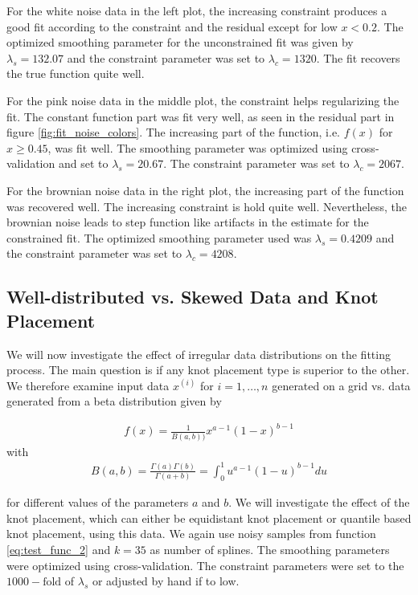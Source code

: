 \documentclass[10pt,a4paper]{article}
\begin{document}
For the white noise data in the left plot, the increasing constraint produces a good fit according to the constraint and the residual except for low $x < 0.2$. The optimized smoothing parameter for the unconstrained fit was given by $\lambda_s = 132.07$ and the constraint parameter was set to $\lambda_c = 1320$. The fit recovers the true function quite well. 

For the pink noise data in the middle plot, the constraint helps regularizing the fit. The constant function part was fit very well, as seen in the residual part in figure \ref{fig:fit_noise_colors}. The increasing part of the function, i.e. $f(x)$ for $x \ge 0.45$,  was fit well. The smoothing parameter was optimized using cross-validation and set to $\lambda_s = 20.67$. The constraint parameter was set to $\lambda_c = 2067$. 

For the brownian noise data in the right plot, the increasing part of the function was recovered well. The increasing constraint is hold quite well. Nevertheless, the brownian noise leads to step function like artifacts in the estimate for the constrained fit. The optimized smoothing parameter used was $\lambda_s = 0.4209$ and the constraint parameter was set to $\lambda_c = 4208$.

\subsection{Well-distributed vs. Skewed Data and Knot Placement} \label{subsec:skewed-data}
We will now investigate the effect of irregular data distributions on the fitting process. The main question is if any knot placement type is superior to the other. We therefore examine input data $x^{(i)}$ for $i = 1, \dots, n$ generated on a grid vs. data generated from a beta distribution given by

\begin{align}
	f(x) = \frac{1}{B(a, b))} x^{a-1} (1-x)^{b-1} 
\end{align}
with
\begin{align}
	B(a,b) = \frac{\Gamma(a)\Gamma(b)}{\Gamma(a+b)} = \int_0^1 u^{a-1} (1-u)^{b-1} du
\end{align}


for different values of the parameters $a$ and $b$. We will investigate the effect of the knot placement, which can either be equidistant knot placement or quantile based knot placement, using this data. We again use noisy samples from function \ref{eq:test_func_2} and $k=35$ as number of splines. The smoothing parameters were optimized using cross-validation. The constraint parameters were set to the $1000-\text{fold}$ of $\lambda_s$ or adjusted by hand if to low.
\end{document}
